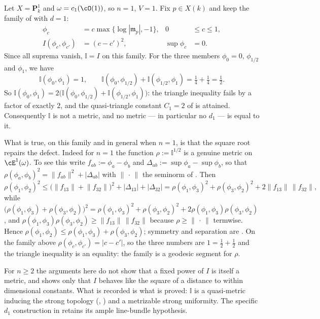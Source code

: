 \begin{example}
\label{ex:ch48-not-a-metric}
Let $X=\mathbf P^1_k$ and $\omega=c_1(\cO(1))$, so $n=1$, $V=1$.
Fix $p\in X(k)$ and keep the family of
 with $d=1$:
\[
 \begin{aligned}
  \phi_c&=c\max\{\log|\mathfrak m_p|,-1\},&0&\le c\le1,\\
  I(\phi_c,\phi_{c'})&=(c-c')^2,&\sup\phi_c&=0.
 \end{aligned}
\]
Since all suprema vanish, $\mathbb I=I$ on this family. For the
three members $\phi_0=0$, $\phi_{1/2}$ and $\phi_1$, we have
\[
 \mathbb I(\phi_0,\phi_1)=1,
 \qquad
 \mathbb I(\phi_0,\phi_{1/2})+\mathbb I(\phi_{1/2},\phi_1)
 =\tfrac14+\tfrac14=\tfrac12 .
\]
So $\mathbb I(\phi_0,\phi_1)=2\bigl(\mathbb I(\phi_0,\phi_{1/2})
+\mathbb I(\phi_{1/2},\phi_1)\bigr)$: the triangle inequality fails by a
factor of exactly $2$, and the quasi-triangle constant
$C_1=2$ of  is attained.  Consequently
$\mathbb I$ is not a metric, and no metric --- in particular no
$d_1$ --- is equal to it.

What is true, on this family and in general when $n=1$, is that the
square root repairs the defect.  Indeed for $n=1$ the function
$\rho:=\mathbb I^{1/2}$ is a genuine metric on $\cE^1(\omega)$.  To see
this write $f_{ab}:=\phi_a-\phi_b$ and
$\Delta_{ab}:=\sup\phi_a-\sup\phi_b$, so that
$\rho(\phi_a,\phi_b)^2=\lVert f_{ab}\rVert^2+|\Delta_{ab}|$ with
$\lVert\,\cdot\,\rVert$ the seminorm of .
Then
\[
 \rho(\phi_1,\phi_2)^2
 \le\bigl(\lVert f_{13}\rVert+\lVert f_{32}\rVert\bigr)^2
   +|\Delta_{13}|+|\Delta_{32}|
 =\rho(\phi_1,\phi_3)^2+\rho(\phi_3,\phi_2)^2
   +2\lVert f_{13}\rVert\,\lVert f_{32}\rVert,
\]
while
$\bigl(\rho(\phi_1,\phi_3)+\rho(\phi_3,\phi_2)\bigr)^2
=\rho(\phi_1,\phi_3)^2+\rho(\phi_3,\phi_2)^2
+2\rho(\phi_1,\phi_3)\rho(\phi_3,\phi_2)$, and
$\rho(\phi_1,\phi_3)\rho(\phi_3,\phi_2)\ge
\lVert f_{13}\rVert\,\lVert f_{32}\rVert$ because
$\rho\ge\lVert\,\cdot\,\rVert$ termwise.  Hence
$\rho(\phi_1,\phi_2)\le\rho(\phi_1,\phi_3)+\rho(\phi_3,\phi_2)$;
symmetry and separation are .  On the family
above $\rho(\phi_c,\phi_{c'})=|c-c'|$, so the three numbers are
$1=\tfrac12+\tfrac12$ and the triangle inequality is an equality: the
family is a geodesic segment for $\rho$.

For $n\ge2$ the arguments here do not show that a fixed power of $I$
is itself a metric, and
 shows only that $I$ behaves like the
square of a distance to within dimensional constants.  What is recorded is
what is proved: $\mathbb I$ is a quasi-metric inducing the strong
topology (,
) and a metrizable strong uniformity.
The specific $d_1$ construction in
 retains its ample line-bundle
hypothesis.
\end{example}


